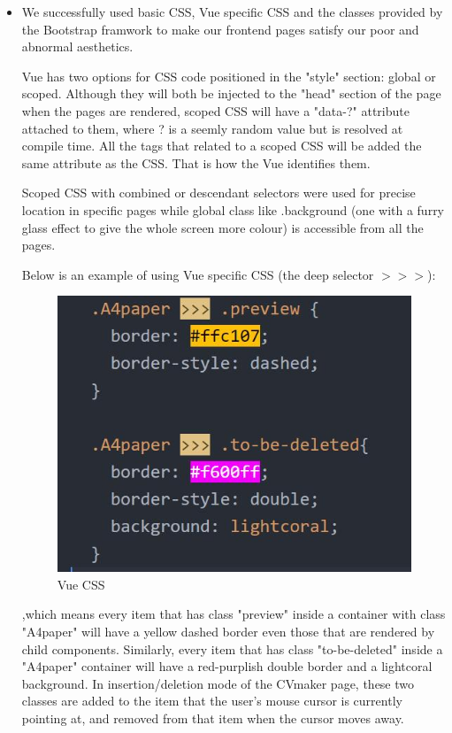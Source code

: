 \documentclass[11pt]{article}
\begin{document}
\begin{spacing}{1.0}
\begin{itemize}
	\item
	We successfully used basic CSS, Vue specific CSS and the classes provided by the Bootstrap framwork to make our frontend pages satisfy our poor and abnormal aesthetics. 
	
	Vue has two options for CSS code positioned in the "style" section: global or scoped. Although they will both be injected to the "head" section of the page when the pages are rendered, scoped CSS will have a "data-?" attribute attached to them, where ? is a seemly random value but is resolved at compile time. All the tags that related to a scoped CSS will be added the same attribute as the CSS. That is how the Vue identifies them.
	
	Scoped CSS with combined or descendant selectors were used for precise location in specific pages while global class like .background (one with a furry glass effect to give the whole screen more colour) is accessible from all the pages.
	
	Below is an example of using Vue specific CSS (the deep selector $>>>$):
	\begin{figure}[H]
	\centering
	\includegraphics[scale=.5]{figures/html/4_basicCSS.jpg}
	\caption{Vue CSS}
	\end{figure}

	,which means every item that has class "preview" inside a container with class "A4paper" will have a yellow dashed border even those that are rendered by child components. Similarly, every item that has class "to-be-deleted" inside a "A4paper" container will have a red-purplish double border and a lightcoral background. In insertion/deletion mode of the CVmaker page, these two classes are added to the item that the user's mouse cursor is currently pointing at, and removed from that item when the cursor moves away. 
	


\end{itemize}
\end{spacing}
\end{document}
